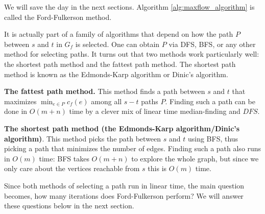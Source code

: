 \documentclass [12pt]{article}
\theoremstyle{definition}
\begin{document}
We will save the day in the next sections. Algorithm \ref{alg:maxflow_algorithm} is called the Ford-Fulkerson method.

It is actually part of a family of algorithms that depend on how the path $P$ between $s$ and $t$ in $G_f$ is selected. One can obtain $P$ via DFS, BFS, or any other method for selecting paths. It turns out that two methods work particularly well: the shortest path method and the fattest path method. The shortest path method is known as the Edmonds-Karp algorithm or Dinic's algorithm. 

\textbf{The fattest path method.} This method finds a path between $s$ and $t$ that maximizes $\min_{e \in P} c_f (e)$ among all $s-t$ paths $P$. Finding such a path can be done in $O(m + n)$ time by a clever mix of linear time median-finding and $DFS$. 


\textbf{The shortest path method (the Edmonds-Karp algorithm/Dinic's algorithm)}. This method picks the path between $s$ and $t$ using BFS, thus picking a path that minimizes the number of edges. Finding such a path also runs in $O(m)$ time: BFS takes $O(m + n)$ to explore the whole graph, but since we only care about the vertices reachable from $s$ this is $O(m)$ time. 

Since both methods of selecting a path run in linear time, the main question becomes, how many iterations does Ford-Fulkerson perform? We will answer these questions below in the next section.
\end{document}
